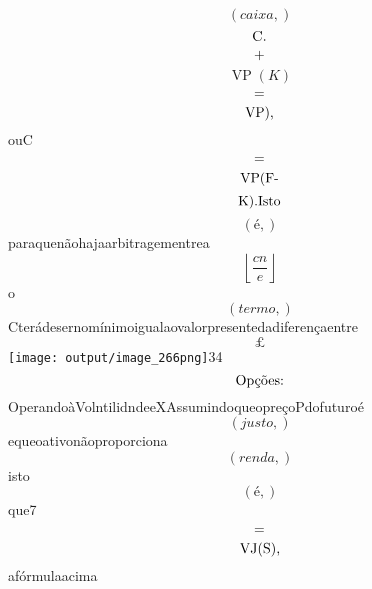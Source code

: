 \documentclass{article}
\begin{document}
\begin{equation}
\left( caixa,\right)
\end{equation}\begin{equation}
$C.$
\end{equation}\begin{equation}
$+$
\end{equation}\begin{equation}
\operatorname{VP}{\left(K \right)}
\end{equation}\begin{equation}
$=$
\end{equation}\begin{equation}
$VP),$
\end{equation}ouC\begin{equation}
$=$
\end{equation}\begin{equation}
$VP(F-$
\end{equation}\begin{equation}
$K).Isto$
\end{equation}\begin{equation}
\left( é,\right)
\end{equation}paraquenãohajaarbitragementrea\begin{equation}
\left\lfloor{\frac{cn}{e}}\right\rfloor
\end{equation}o\begin{equation}
\left( termo,\right)
\end{equation}Cterádesernomínimoigualaovalorpresentedadiferençaentre\begin{equation}
£
\end{equation}\texttt{[image: output/image\_266png]}34\begin{equation}
$Opções:$
\end{equation}OperandoàVolntilidndeeXAssumindoqueopreçoPdofuturoé\begin{equation}
\left( justo,\right)
\end{equation}equeoativonãoproporciona\begin{equation}
\left( renda,\right)
\end{equation}isto\begin{equation}
\left( é,\right)
\end{equation}que7\begin{equation}
$=$
\end{equation}\begin{equation}
$VJ(S),$
\end{equation}afórmulaacima\begin{equation}

\end{equation}
\end{document}
